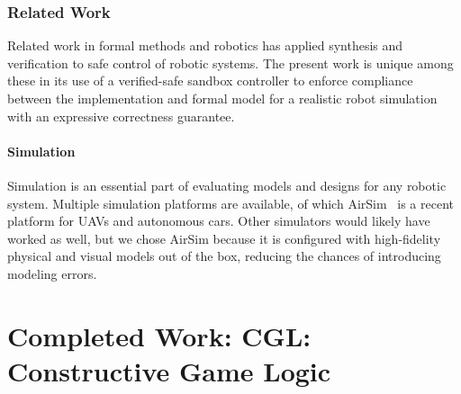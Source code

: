 \documentclass[12pt]{cmuthesis}
\theoremstyle{definition}
\theoremstyle{remark}
\newcommand{\CGL}{\textsf{CGL}\xspace}
\begin{document}
\subsection{Related Work}
Related work in formal methods and robotics has applied synthesis and verification to safe control of robotic systems.
The present work is unique among these in its use of a verified-safe sandbox controller to enforce compliance between the implementation and formal model for a realistic robot simulation with an expressive correctness guarantee.

\subsubsection{Simulation}
Simulation is an essential part of evaluating models and designs for any robotic system.
Multiple simulation platforms are available, of which AirSim~\cite{shah2018airsim} is a recent platform for UAVs and autonomous cars.
Other simulators would likely have worked as well, but we chose AirSim because it is configured with high-fidelity physical and visual models out of the box, reducing the chances of introducing modeling errors.

\chapter{Completed Work: \CGL: Constructive Game Logic}
\label{ch:cgl}
\newcommand{\projUp}[2]{{#1}\uparrow{#2}}
\newcommand{\projDown}[3]{{#1}\downarrow{#2(#3)}}
\newcommand{\projBV}[3]{\projDown{#1}{#2}{\boundvars{#3}^\complement}}
\newcommand{\sapp}[2]{#1(#2)}
\newcommand{\sadj}[2]{#1^*(#2)}
\newcommand{\spp}[1]{\sapp{\sigma}{#1}}
\newcommand{\adj}[1]{\sadj{\sigma}{#1}}
\newcommand{\drv}{\mathcal{D}}
\newcommand{\nzvar}{\textit{nz}}
\newcommand{\convvar}{\textit{cnv}}
\newcommand{\erefl}{\textsf{refl}}
\newcommand{\pstep}{\textsf{step}}
\newcommand{\modvar}{\textit{mod}}
\newcommand{\monvar}{\textsf{m}
}
\newcommand{\rangevar}{\textsf{Range}}
\newcommand{\testvar}{\textsf{test}}
\newcommand{\elem}[2]{\textsf{Dec}[#1](#2)}
\newcommand{\spc}{\hspace{0.15in}}
\newcommand{\kwmod}{\textsf{mod}}
\newcommand{\emod}[2]{#1~\kwmod~#2}
\newcommand{\kwdiv}{\textsf{div}}
\newcommand{\ediv}[2]{#1~\kwdiv~#2}
\newcommand{\kwsig}{\Sigma}
\newcommand{\sig}[1]{\kwsig(#1)}
\newcommand{\nim}{\textsc{Nim}}
\newcommand{\cake}{\textsc{CC}}
\newcommand{\interp}{I}
\newcommand{\valset}[1]{\mathfrak{V}(#1)}
\newcommand{\kwbool}{\m{\mathbb{B}}}
\newcommand{\kwint}{\m{\mathbb{Z}}}
\newcommand{\kwreal}{\m{\mathbb{R}}}
\newcommand{\kwintsig}{\Xi}
\newcommand{\intsig}[1]{\kwintsig(#1)}
\newcommand{\churchkleene}{\omega_{\text{CK}}}
\newcommand{\restL}[1]{#1_L}
\newcommand{\restR}[1]{#1_R}
\newcommand{\apL}[1]{#1_{\langle{0}\rangle}}
\newcommand{\apR}[1]{#1_{\langle{1}\rangle}}
\newcommand{\dpL}[1]{#1_{[0]}}
\newcommand{\dpR}[1]{#1_{[1]}}
\end{document}
